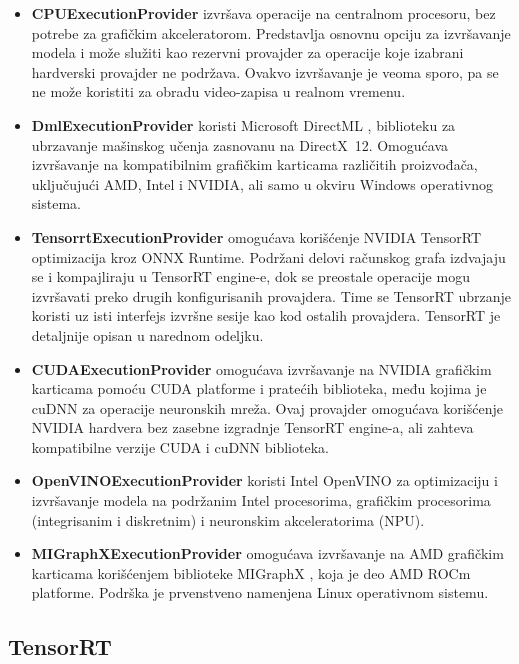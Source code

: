 \documentclass[12pt,a4paper]{article}
\begin{document}
\begin{itemize}
	\item \textbf{CPUExecutionProvider} izvršava operacije na centralnom procesoru, bez potrebe za grafičkim akceleratorom. Predstavlja osnovnu opciju za izvršavanje modela i može služiti kao rezervni provajder za operacije koje izabrani hardverski provajder ne podržava. Ovakvo izvršavanje je veoma sporo, pa se ne može koristiti za obradu video-zapisa u realnom vremenu.

	\item \textbf{DmlExecutionProvider} koristi Microsoft DirectML \cite{DirectML}, biblioteku za ubrzavanje mašinskog učenja zasnovanu na DirectX~12. Omogućava izvršavanje na kompatibilnim grafičkim karticama različitih proizvođača, uključujući AMD, Intel i NVIDIA, ali samo u okviru Windows operativnog sistema.
	
	\item \textbf{TensorrtExecutionProvider} omogućava korišćenje NVIDIA TensorRT optimizacija kroz ONNX Runtime. Podržani delovi računskog grafa izdvajaju se i kompajliraju u TensorRT engine-e, dok se preostale operacije mogu izvršavati preko drugih konfigurisanih provajdera. Time se TensorRT ubrzanje koristi uz isti interfejs izvršne sesije kao kod ostalih provajdera. TensorRT je detaljnije opisan u narednom odeljku.

	\item \textbf{CUDAExecutionProvider} omogućava izvršavanje na NVIDIA grafičkim karticama pomoću CUDA platforme \cite{CUDA} i pratećih biblioteka, među kojima je cuDNN \cite{cuDNN} za operacije neuronskih mreža. Ovaj provajder omogućava korišćenje NVIDIA hardvera bez zasebne izgradnje TensorRT engine-a, ali zahteva kompatibilne verzije CUDA i cuDNN biblioteka.

	\item \textbf{OpenVINOExecutionProvider} koristi Intel OpenVINO \cite{OpenVINO} za optimizaciju i izvršavanje modela na podržanim Intel procesorima, grafičkim procesorima (integrisanim i diskretnim) i neuronskim akceleratorima (NPU).

	\item \textbf{MIGraphXExecutionProvider} omogućava izvršavanje na AMD grafičkim karticama korišćenjem biblioteke MIGraphX \cite{MIGraphX}, koja je deo AMD ROCm platforme. Podrška je prvenstveno namenjena Linux operativnom sistemu.
\end{itemize}

\subsection{TensorRT}
\end{document}
